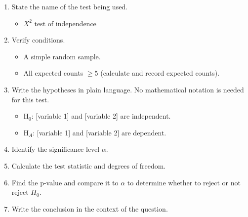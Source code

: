 \begin{termBox}{
\begin{enumerate}
\setlength{\itemsep}{0mm}
\item State the name of the test being used.\vspace{-2mm}
\begin{itemize}
\setlength{\itemsep}{0mm}
\item $X^2$ test of independence
\end{itemize}
\item Verify conditions.\vspace{-2mm}
\begin{itemize}
\setlength{\itemsep}{0mm}
\item A simple random sample.
\item All expected counts $\ge 5$ (calculate and record expected counts).
\end{itemize}
\item Write the hypotheses in plain language. No mathematical notation is needed for this test.\vspace{-2mm}
\begin{itemize}
\item H$_0$: [variable 1] and [variable 2] are independent.
\item H$_A$: [variable 1] and [variable 2] are dependent.
\end{itemize}
\item Identify the significance level $\alpha$.
\item Calculate the test statistic and degrees of freedom.%
\item Find the p-value and compare it to $\alpha$ to determine whether to reject or not reject $H_0$.
\item Write the conclusion in the context of the question.
\end{enumerate}}
\end{termBox}



